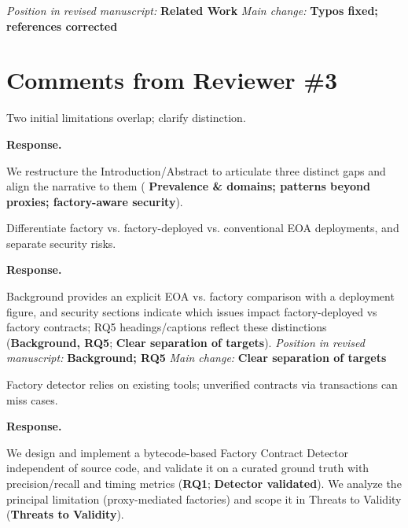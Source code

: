 \documentclass[acmsmall]{acmart}
\begin{document}
\noindent\textit{Position in revised manuscript:} {\color{red}\textbf{Related Work}}
\noindent\textit{Main change:} {\color{blue}\textbf{Typos fixed; references corrected}}

	\newpage
	\section{Comments from Reviewer \#3}

	\begin{tcolorbox}
		[commentbox,title=Reviewer \#3 -- Comment 1] Two initial limitations overlap; clarify
		distinction.
	\end{tcolorbox}

	\noindent
	\textbf{Response.}

	We restructure the Introduction/Abstract to articulate three distinct gaps and align the
	narrative to them (
	{\textbf{Prevalence \& domains; patterns beyond proxies; factory-aware security}}).

	\begin{tcolorbox}
		[commentbox,title=Reviewer \#3 -- Comment 2] Differentiate factory vs. factory-deployed vs. conventional
		EOA deployments, and separate security risks.
	\end{tcolorbox}

	\noindent
	\textbf{Response.}

	Background provides an explicit EOA vs. factory comparison with a deployment figure, and
	security sections indicate which issues impact factory-deployed vs factory contracts; RQ5 headings/captions
	reflect these distinctions ({\textbf{Background, RQ5}}; {\textbf{Clear separation of targets}}).
\noindent\textit{Position in revised manuscript:} {\color{red}\textbf{Background; RQ5}}
\noindent\textit{Main change:} {\color{blue}\textbf{Clear separation of targets}}

	\begin{tcolorbox}
		[commentbox,title=Reviewer \#3 -- Comment 3] Factory detector relies on existing tools;
		unverified contracts via transactions can miss cases.
	\end{tcolorbox}

	\noindent
	\textbf{Response.}

	We design and implement a bytecode-based Factory Contract Detector independent of source code, and
	validate it on a curated ground truth with precision/recall and timing metrics ({\textbf{RQ1}}; {\textbf{Detector validated}}).
	We analyze the principal limitation (proxy-mediated factories) and scope it in Threats to Validity
	({\textbf{Threats to Validity}}).
\end{document}
